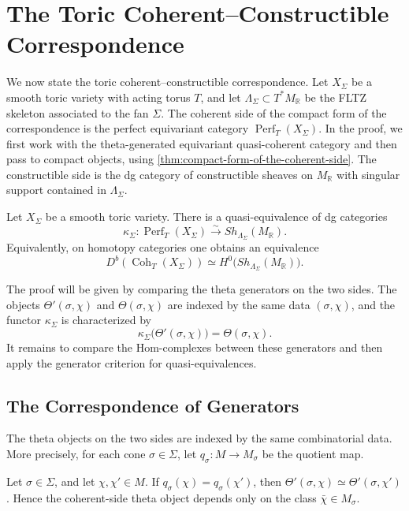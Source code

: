 \section{The Toric Coherent--Constructible Correspondence}

We now state the toric coherent--constructible correspondence. Let \(X_\Sigma\)
be a smooth toric variety with acting torus \(T\), and let
\(\Lambda_\Sigma\subset T^*M_{\mathbb R}\) be the FLTZ skeleton associated to
the fan \(\Sigma\). The coherent side of the compact form of the correspondence
is the perfect equivariant category \(\operatorname{Perf}_T(X_\Sigma)\). In the
proof, we first work with the theta-generated equivariant quasi-coherent
category and then pass to compact objects, using
\cref{thm:compact-form-of-the-coherent-side}. The constructible side is the dg
category of constructible sheaves on \(M_{\mathbb R}\) with singular support
contained in \(\Lambda_\Sigma\).



\begin{theorem}\label{thm:toric-ccc}
Let \(X_\Sigma\) be a smooth toric variety. There is a quasi-equivalence of
dg categories
\[
\kappa_\Sigma:
\operatorname{Perf}_T(X_\Sigma)
\xrightarrow{\sim}
Sh_{\Lambda_\Sigma}(M_{\mathbb R}).
\]
Equivalently, on homotopy categories one obtains an equivalence
\[
D^b(\operatorname{Coh}_T(X_\Sigma))
\simeq
H^0\bigl(Sh_{\Lambda_\Sigma}(M_{\mathbb R})\bigr).
\]
\end{theorem}

The proof will be given by comparing the theta generators on the two sides.
The objects \(\Theta'(\sigma,\chi)\) and \(\Theta(\sigma,\chi)\) are indexed
by the same data \((\sigma,\chi)\), and the functor \(\kappa_\Sigma\) is
characterized by
\[
\kappa_\Sigma\bigl(\Theta'(\sigma,\chi)\bigr)=\Theta(\sigma,\chi).
\]
It remains to compare the Hom-complexes between these generators and then
apply the generator criterion for quasi-equivalences.


\subsection{The Correspondence of Generators}

The theta objects on the two sides are indexed by the same combinatorial
data. More precisely, for each cone \(\sigma\in\Sigma\), let
\(q_\sigma:M\to M_\sigma\) be the quotient map.

\begin{lemma}
Let \(\sigma\in\Sigma\), and let \(\chi,\chi'\in M\). If
\(q_\sigma(\chi)=q_\sigma(\chi')\), then
\(\Theta'(\sigma,\chi)\simeq \Theta'(\sigma,\chi')\).
Hence the coherent-side theta object depends only on the class
\(\bar\chi\in M_\sigma\).
\end{lemma}

